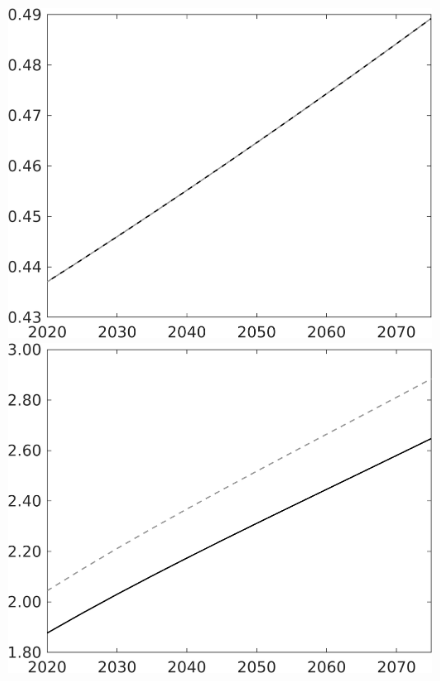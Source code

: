 \documentclass[12pt]{article}
\begin{document}
\begin{figure}[h!!]
\begin{minipage}[]{0.32\textwidth}
\end{minipage}	
\begin{minipage}[]{0.32\textwidth}
\includegraphics[width=1\textwidth]{../../codding_model/own_basedOnFried/optimalPol_010922_revision/figures/all_13Sept22/CompTaul_Equlab_LFBAU_Reg0_EY_spillover0_nsk1_xgr1_knspil1_sep1_countec0_GovRev0_etaa0.79_lgd0.png}
\end{minipage}	
\begin{minipage}[]{0.32\textwidth}
\includegraphics[width=1\textwidth]{../../codding_model/own_basedOnFried/optimalPol_010922_revision/figures/all_13Sept22/CompTaul_Equlab_LFBAU_Reg0_N_spillover0_nsk1_xgr1_knspil1_sep1_countec0_GovRev0_etaa0.79_lgd0.png}
\end{minipage}	
\end{figure}
\end{document}
